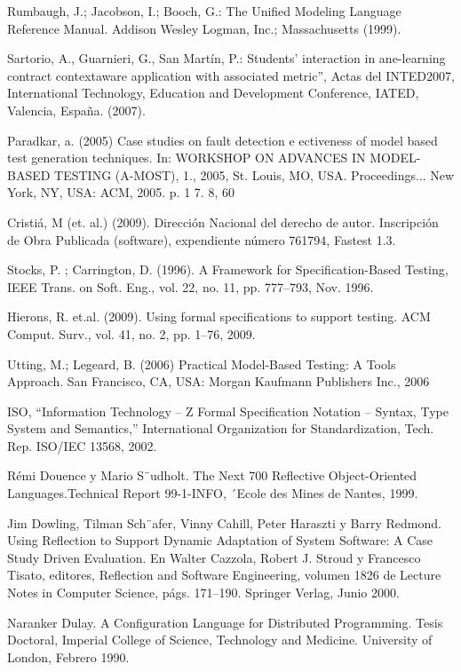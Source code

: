 \begin{thebibliography}{1}
{\bibitem{} 
Rumbaugh, J.; Jacobson, I.; Booch, G.: The Unified Modeling Language
Reference Manual. Addison Wesley Logman, Inc.; Massachusetts (1999).


\bibitem{}
Sartorio, A., Guarnieri, G., San Martín, P.: Students’ interaction in
ane-learning contract contextaware application with associated metric”, Actas
del INTED2007, International Technology, Education and Development Conference,
IATED, Valencia, España. (2007).

\bibitem{}
Paradkar, a. (2005) Case studies on fault detection e ectiveness of model
based test generation techniques. In: WORKSHOP ON ADVANCES IN MODEL-BASED
TESTING (A-MOST), 1., 2005, St. Louis, MO, USA. Proceedings... New York, NY,
USA: ACM, 2005. p. 1 7. 8, 60

\bibitem{}
Cristiá, M (et. al.) (2009). Dirección Nacional del derecho de autor.
Inscripción de Obra Publicada (software), expendiente número 761794, Fastest
1.3.

\bibitem{}
Stocks, P. ;  Carrington, D. (1996). A Framework for Specification-Based
Testing, IEEE Trans. on Soft. Eng., vol. 22, no. 11, pp. 777–793, Nov. 1996.


\bibitem{}
Hierons,  R. et.al. (2009). Using formal specifications to support
testing.  ACM Comput. Surv., vol. 41, no. 2, pp. 1–76, 2009.

\bibitem{}
Utting, M.;  Legeard, B. (2006) Practical Model-Based Testing: A Tools
Approach.  San Francisco, CA, USA: Morgan Kaufmann Publishers Inc., 2006

\bibitem{}
ISO, “Information Technology – Z Formal Specification Notation – Syntax, Type
System and Semantics,” International Organization for Standardization,  Tech.
Rep. ISO/IEC 13568, 2002.


\bibitem{}
Rémi Douence y Mario S¨udholt. The Next 700 Reflective Object-Oriented
Languages.Technical Report 99-1-INFO, ´Ecole des Mines de Nantes, 1999.

\bibitem{}
Jim Dowling, Tilman Sch¨afer, Vinny Cahill, Peter Haraszti y Barry
Redmond. Using Reflection to Support Dynamic Adaptation of System Software: A
Case Study Driven Evaluation. En Walter Cazzola, Robert J. Stroud y Francesco
Tisato, editores, Reflection and Software Engineering, volumen 1826 de Lecture
Notes in Computer Science, págs. 171–190. Springer Verlag, Junio 2000.

\bibitem{}
Naranker Dulay. A Configuration Language for Distributed Programming.
Tesis Doctoral, Imperial College of Science, Technology and Medicine. University
of London, Febrero 1990.

}
\end{thebibliography}
